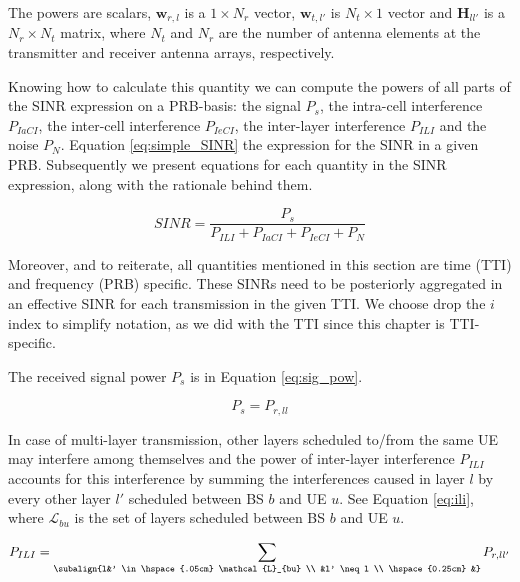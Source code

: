 The powers are scalars, $\bm{w}_{r, l}$ is a $1 \times N_r$ vector, $\bm{w}_{t, l'}$ is $N_t \times 1$ vector and $\bm{H}_{ll'}$ is a $N_r \times N_t$ matrix, where $N_t$ and $N_r$ are the number of antenna elements at the transmitter and receiver antenna arrays, respectively.

Knowing how to calculate this quantity we can compute the powers of all parts of the SINR expression on a PRB-basis: the signal $P_s$, the intra-cell interference $P_{IaCI}$, the inter-cell interference $P_{IeCI}$, the inter-layer interference $P_{ILI}$ and the noise $P_N$. Equation \eqref{eq:simple_SINR} the expression for the SINR in a given PRB. Subsequently we present equations for each quantity in the SINR expression, along with the rationale behind them. 


\begin{equation} \label{eq:simple_SINR}
    SINR = \frac{P_s}{P_{ILI} + P_{IaCI} + P_{IeCI} + P_N}
\end{equation}

Moreover, and to reiterate, all quantities mentioned in this section are time (TTI) and frequency (PRB) specific. These SINRs need to be posteriorly aggregated in an effective SINR for each transmission in the given TTI. We choose drop the $i$ index to simplify notation, as we did with the TTI since this chapter is TTI-specific.

The received signal power $P_s$ is in Equation \eqref{eq:sig_pow}.

\begin{equation} \label{eq:sig_pow}
    P_s = P_{r, ll} 
\end{equation}


In case of multi-layer transmission, other layers scheduled to/from the same UE may interfere among themselves and the power of inter-layer interference $P_{ILI}$ accounts for this interference by summing the interferences caused in layer $l$ by every other layer $l'$ scheduled between BS $b$ and UE $u$. See Equation \eqref{eq:ili}, where $\mathcal{L}_{bu}$ is the set of layers scheduled between BS $b$ and UE $u$.

\begin{equation} \label{eq:ili}
    P_{ILI} = \sum_{\subalign{l&' \in \hspace{.05cm} \mathcal{L}_{bu} \\ &l' \neq l \\ \hspace{0.25cm} &}} P_{r, ll'} 
\end{equation}

